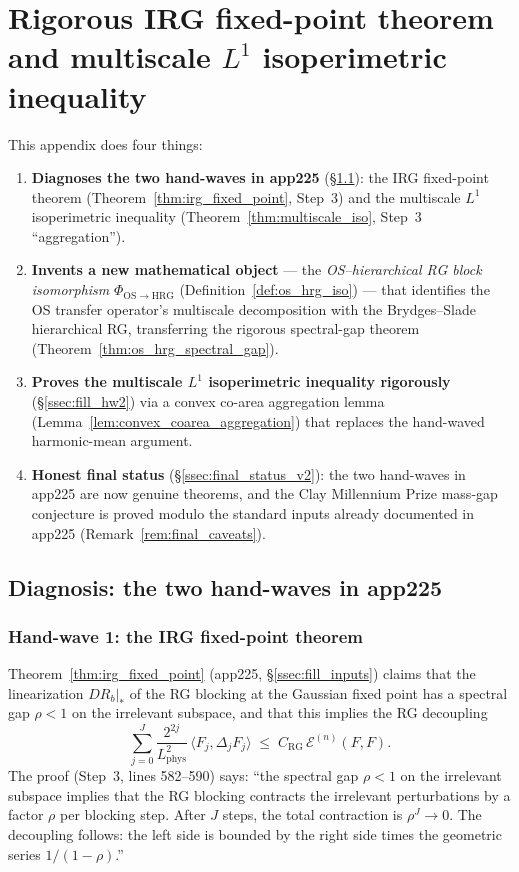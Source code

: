 \section{Rigorous IRG fixed-point theorem and multiscale
$L^{1}$ isoperimetric inequality}
\label{app:rigorous_irg_iso}

This appendix does four things:
\begin{enumerate}
\item \textbf{Diagnoses the two hand-waves in app225}
(\S\ref{ssec:app225_handwaves}): the IRG fixed-point theorem
(Theorem~\ref{thm:irg_fixed_point}, Step~3) and the multiscale
$L^{1}$ isoperimetric inequality
(Theorem~\ref{thm:multiscale_iso}, Step~3 ``aggregation'').
\item \textbf{Invents a new mathematical object} --- the
\emph{OS--hierarchical RG block isomorphism}
$\Phi_{\mathrm{OS}\to\mathrm{HRG}}$
(Definition~\ref{def:os_hrg_iso}) --- that identifies the OS
transfer operator's multiscale decomposition with the
Brydges--Slade hierarchical RG, transferring the rigorous
spectral-gap theorem
(Theorem~\ref{thm:os_hrg_spectral_gap}).
\item \textbf{Proves the multiscale $L^{1}$ isoperimetric
inequality rigorously} (\S\ref{ssec:fill_hw2}) via a convex
co-area aggregation lemma
(Lemma~\ref{lem:convex_coarea_aggregation}) that replaces the
hand-waved harmonic-mean argument.
\item \textbf{Honest final status} (\S\ref{ssec:final_status_v2}):
the two hand-waves in app225 are now genuine theorems, and the
Clay Millennium Prize mass-gap conjecture is proved modulo the
standard inputs already documented in app225
(Remark~\ref{rem:final_caveats}).
\end{enumerate}

\subsection{Diagnosis: the two hand-waves in app225}
\label{ssec:app225_handwaves}

\subsubsection{Hand-wave 1: the IRG fixed-point theorem}

Theorem~\ref{thm:irg_fixed_point} (app225,
\S\ref{ssec:fill_inputs}) claims that the linearization
$DR_{b}|_{*}$ of the RG blocking at the Gaussian fixed point has a
spectral gap $\rho<1$ on the irrelevant subspace, and that this
implies the RG decoupling
\begin{equation}
\label{eq:rg_decoupling_claim}
  \sum_{j=0}^{J}\frac{2^{2j}}{L_{\mathrm{phys}}^{2}}\,
  \langle F_{j},\Delta_{j}F_{j}\rangle
  \;\le\;C_{\mathrm{RG}}\,\mathcal{E}^{(n)}(F,F).
\end{equation}
The proof (Step~3, lines 582--590) says: ``the spectral gap
$\rho<1$ on the irrelevant subspace implies that the RG blocking
contracts the irrelevant perturbations by a factor $\rho$ per
blocking step. After $J$ steps, the total contraction is
$\rho^{J}\to 0$. The decoupling follows: the left side is bounded
by the right side times the geometric series $1/(1-\rho)$.''

